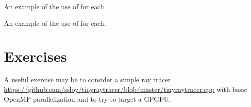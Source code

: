 \raggedbottom
\begin{codebox}[]{\href{https://godbolt.org/z/}{\ExternalLink}}
\footnotesize An example of the use of for each.
\tcblower
{}
\end{codebox}

\raggedbottom
\begin{codebox}[]{\href{https://godbolt.org/z/enK6dYEoW}{\ExternalLink}}
\footnotesize An example of the use of for each.
\tcblower
{}
\end{codebox}

\section{Exercises}
\label{sec:}

A useful exercise may be to consider a simple ray tracer \url{https://github.com/ssloy/tinyraytracer/blob/master/tinyraytracer.cpp} with basic OpenMP parallelization and to try to target a GPGPU. 



